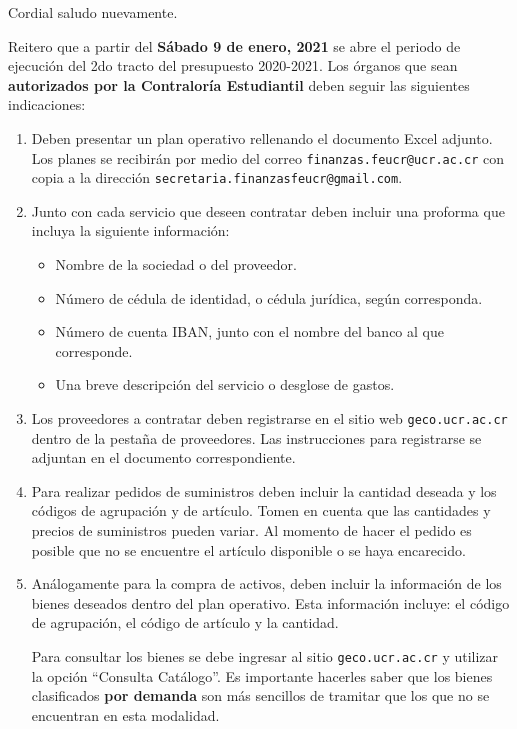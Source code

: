 \documentclass[12pt]{article}
\begin{document}
Cordial saludo nuevamente.\par
Reitero que a partir del \textbf{Sábado 9 de enero, 2021} se abre el periodo de ejecución del 2do tracto del presupuesto 2020-2021. Los órganos que sean \textbf{autorizados por la Contraloría Estudiantil} deben seguir las siguientes indicaciones:
\begin{enumerate}
  \item Deben presentar un plan operativo rellenando el documento Excel adjunto. Los planes se recibirán por medio del correo \texttt{finanzas.feucr@ucr.ac.cr}
      con copia a la dirección \texttt{secretaria.finanzasfeucr@gmail.com}.
  \item Junto con cada servicio que deseen contratar deben incluir una proforma que incluya la siguiente información:
      \begin{itemize}
        \item Nombre de la sociedad o del proveedor.
        \item Número de cédula de identidad, o cédula jurídica, según corresponda.
\item Número de cuenta IBAN, junto con el nombre del banco al que corresponde.
\item Una breve descripción del servicio o desglose de gastos.
      \end{itemize}
  \item Los proveedores a contratar deben registrarse en el sitio web \texttt{geco.ucr.ac.cr} dentro de la pestaña de proveedores. Las instrucciones para registrarse se adjuntan en el documento correspondiente.
  \item Para realizar pedidos de suministros deben incluir la cantidad deseada y los códigos de agrupación y de artículo. Tomen en cuenta que las cantidades y precios de suministros pueden variar. Al momento de hacer el pedido es posible que no se encuentre el artículo disponible o se haya encarecido.
  \item Análogamente para la compra de activos, deben incluir la información de los bienes deseados dentro del plan operativo. Esta información incluye: el código de agrupación, el código de artículo y la cantidad.\par
      Para consultar los bienes se debe ingresar al sitio \texttt{geco.ucr.ac.cr} y utilizar la opción ``Consulta Catálogo''. Es importante hacerles saber que los bienes clasificados \textbf{por demanda} son más sencillos de tramitar que los que no se encuentran en esta modalidad.
\end{enumerate}
\end{document}
